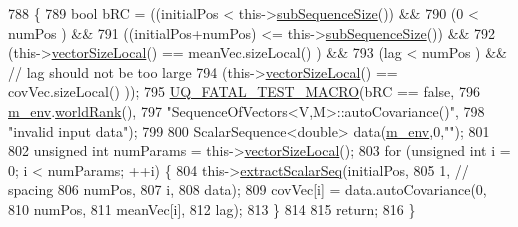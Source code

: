 \begin{DoxyCode}
788 \{
789   \textcolor{keywordtype}{bool} bRC = ((initialPos              <  this->\hyperlink{class_q_u_e_s_o_1_1_sequence_of_vectors_a0224bd3e961d86af5d2886301c0c2b86}{subSequenceSize}()) &&
790               (0                       <  numPos                 ) &&
791               ((initialPos+numPos)     <= this->\hyperlink{class_q_u_e_s_o_1_1_sequence_of_vectors_a0224bd3e961d86af5d2886301c0c2b86}{subSequenceSize}()) &&
792               (this->\hyperlink{class_q_u_e_s_o_1_1_base_vector_sequence_a2fefedf9e5b90f22881103b3f92555f6}{vectorSizeLocal}() == meanVec.sizeLocal()    ) &&
793               (lag                     <  numPos                 ) && \textcolor{comment}{// lag should not be too large}
794               (this->\hyperlink{class_q_u_e_s_o_1_1_base_vector_sequence_a2fefedf9e5b90f22881103b3f92555f6}{vectorSizeLocal}() == covVec.sizeLocal()     ));
795   \hyperlink{_defines_8h_a56d63d18d0a6d45757de47fcc06f574d}{UQ\_FATAL\_TEST\_MACRO}(bRC == \textcolor{keyword}{false},
796                       \hyperlink{class_q_u_e_s_o_1_1_base_vector_sequence_a8e8824d2a63c5a43bcc6473e3a0491e8}{m\_env}.\hyperlink{class_q_u_e_s_o_1_1_base_environment_a78b57112bbd0e6dd0e8afec00b40ffa7}{worldRank}(),
797                       \textcolor{stringliteral}{"SequenceOfVectors<V,M>::autoCovariance()"},
798                       \textcolor{stringliteral}{"invalid input data"});
799 
800   ScalarSequence<double> data(\hyperlink{class_q_u_e_s_o_1_1_base_vector_sequence_a8e8824d2a63c5a43bcc6473e3a0491e8}{m\_env},0,\textcolor{stringliteral}{""});
801 
802   \textcolor{keywordtype}{unsigned} \textcolor{keywordtype}{int} numParams = this->\hyperlink{class_q_u_e_s_o_1_1_base_vector_sequence_a2fefedf9e5b90f22881103b3f92555f6}{vectorSizeLocal}();
803   \textcolor{keywordflow}{for} (\textcolor{keywordtype}{unsigned} \textcolor{keywordtype}{int} i = 0; i < numParams; ++i) \{
804     this->\hyperlink{class_q_u_e_s_o_1_1_sequence_of_vectors_ac977b3b26a6af2ae727671f1246262fd}{extractScalarSeq}(initialPos,
805                            1, \textcolor{comment}{// spacing}
806                            numPos,
807                            i,
808                            data);
809     covVec[i] = data.autoCovariance(0,
810                                     numPos,
811                                     meanVec[i],
812                                     lag);
813   \}
814 
815   \textcolor{keywordflow}{return};
816 \}
\end{DoxyCode}
